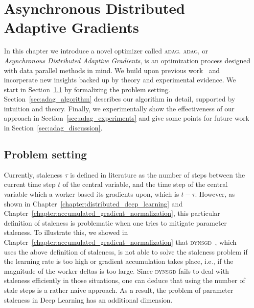 %
%
%

\chapter{Asynchronous Distributed Adaptive Gradients}
\label{chapter:asynchronous_distributed_adaptive_gradients}

In this chapter we introduce a novel optimizer called \textsc{adag}. \textsc{adag}, or \emph{Asynchronous Distributed Adaptive Gradients}, is an optimization process designed with data parallel methods in mind. We build upon previous work~\cite{dean2012large,hadjis2016omnivore,kingma2014adam,zhang2015deep,jiang2017heterogeneity} and incorperate new insights backed up by theory and experimental evidence. We start in Section~\ref{sec:adag_problem_setting} by formalizing the problem setting. Section~\ref{sec:adag_algorithm} describes our algorithm in detail, supported by intuition and theory. Finally, we experimentally show the effectiveness of our approach in Section~\ref{sec:adag_experiments} and give some points for future work in Section~\ref{sec:adag_discussion}.

\section{Problem setting}
\label{sec:adag_problem_setting}

Currently, staleness $\tau$ is defined in literature as the number of steps between the current time step $t$ of the central variable, and the time step of the central variable which a worker based its gradients upon, which is $t - \tau$. However, as shown in Chapter~\ref{chapter:distributed_deep_learning} and Chapter~\ref{chapter:accumulated_gradient_normalization}, this particular definition of staleness is problematic when one tries to mitigate parameter staleness. To illustrate this, we showed in Chapter~\ref{chapter:accumulated_gradient_normalization} that \textsc{dynsgd}~\cite{jiang2017heterogeneity}, which uses the above definition of staleness, is not able to solve the staleness problem if the learning rate is too high or gradient accumulation takes place, i.e., if the magnitude of the worker deltas is too large. Since \textsc{dynsgd} fails to deal with staleness efficiently in those situations, one can deduce that using the number of stale steps is a rather naive approach. As a result, the problem of parameter staleness in Deep Learning has an additional dimension.\\

